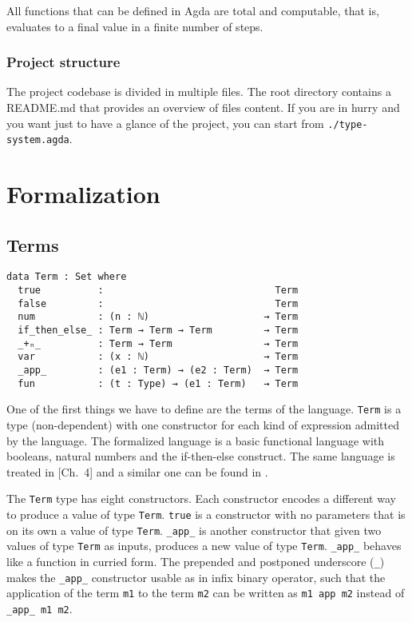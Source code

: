 \documentclass{article}
\begin{document}
All functions that can be defined in Agda are total and computable, that is, evaluates to a final value in a finite number of steps.


\subsubsection*{Project structure}

The project codebase is divided in multiple files.
The root directory contains a README.md that provides an overview of files content.
If you are in hurry and you want just to have a glance of the project, you can start from \texttt{./type-system.agda}.


\section{Formalization}

\subsection{Terms}

\begin{verbatim}
data Term : Set where
  true          :                              Term
  false         :                              Term
  num           : (n : ℕ)                    → Term
  if_then_else_ : Term → Term → Term         → Term
  _+ₙ_          : Term → Term                → Term
  var           : (x : ℕ)                    → Term
  _app_         : (e1 : Term) → (e2 : Term)  → Term
  fun           : (t : Type) → (e1 : Term)   → Term
\end{verbatim}

One of the first things we have to define are the terms of the language.
\texttt{Term} is a type (non-dependent) with one constructor for each kind of expression admitted by the language.
The formalized language is a basic functional language with booleans, natural numbers and the if-then-else construct.
The same language is treated in \cite{crafa}[Ch.\ 4] and a similar one can be found in \cite[Ch.\ 9]{pierce}.

The \texttt{Term} type has eight constructors.
Each constructor encodes a different way to produce a value of type \texttt{Term}.
\texttt{true} is a constructor with no parameters that is on its own a value of type \texttt{Term}.
\texttt{\_app\_} is another constructor that given two values of type \texttt{Term} as inputs, produces a new value of type \texttt{Term}.
\texttt{\_app\_} behaves like a function in curried form.
The prepended and postponed underscore (\texttt{\_}) makes the \texttt{\_app\_} constructor usable as in infix binary operator, such that the application of the term \texttt{m1} to the term \texttt{m2} can be written as \texttt{m1 app m2} instead of \texttt{\_app\_ m1 m2}.
\end{document}
